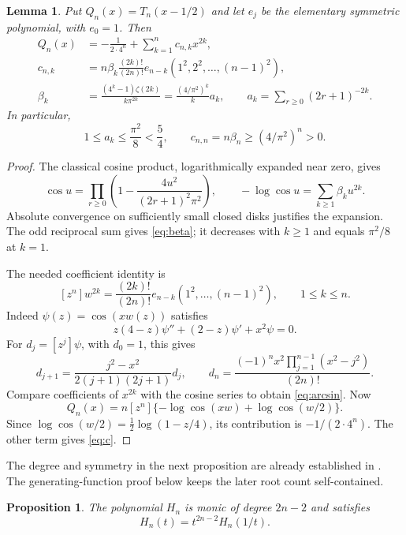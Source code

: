 \documentclass[11pt,letterpaper]{article}
\numberwithin{equation}{section}
\newtheorem{lemma}[theorem]{Lemma}
\newtheorem{proposition}[theorem]{Proposition}
\begin{document}
\begin{lemma}\label{lem:shifted}
Put $Q_n(x)=T_n(x-1/2)$ and let $e_j$ be the elementary symmetric polynomial, with $e_0=1$. Then
\begin{align}
 Q_n(x)&=-\frac1{2\cdot4^n}+\sum_{k=1}^n c_{n,k}x^{2k},\label{eq:Q}\\
 c_{n,k}&=n\beta_k\frac{(2k)!}{(2n)!}
 e_{n-k}(1^2,2^2,\ldots,(n-1)^2),\label{eq:c}\\
 \beta_k&=\frac{(4^k-1)\zeta(2k)}{k\pi^{2k}}
 =\frac{(4/\pi^2)^k}{k}a_k,
 \qquad a_k=\sum_{r\ge0}(2r+1)^{-2k}.\label{eq:beta}
\end{align}
In particular,
\begin{equation}\label{eq:abounds}
 1\le a_k\le\frac{\pi^2}{8}<\frac54,
 \qquad c_{n,n}=n\beta_n\ge(4/\pi^2)^n>0.
\end{equation}
\end{lemma}
\begin{proof}
The classical cosine product, logarithmically expanded near zero, gives
\[
 \cos u=\prod_{r\ge0}\left(1-\frac{4u^2}{(2r+1)^2\pi^2}\right),
 \qquad -\log\cos u=\sum_{k\ge1}\beta_k u^{2k}.
\]
Absolute convergence on sufficiently small closed disks justifies the expansion. The odd reciprocal sum gives \eqref{eq:beta}; it decreases with $k\ge1$ and equals $\pi^2/8$ at $k=1$.

The needed coefficient identity is
\begin{equation}\label{eq:arcsin}
 [z^n]w^{2k}=\frac{(2k)!}{(2n)!}
 e_{n-k}(1^2,\ldots,(n-1)^2),\qquad 1\le k\le n.
\end{equation}
Indeed $\psi(z)=\cos(xw(z))$ satisfies
\[
 z(4-z)\psi''+(2-z)\psi'+x^2\psi=0.
\]
For $d_j=[z^j]\psi$, with $d_0=1$, this gives
\[
 d_{j+1}=\frac{j^2-x^2}{2(j+1)(2j+1)}d_j,
 \qquad d_n=\frac{(-1)^nx^2\prod_{j=1}^{n-1}(x^2-j^2)}{(2n)!}.
\]
Compare coefficients of $x^{2k}$ with the cosine series to obtain \eqref{eq:arcsin}. Now
\[
 Q_n(x)=n[z^n]\{-\log\cos(xw)+\log\cos(w/2)\}.
\]
Since $\log\cos(w/2)=\tfrac12\log(1-z/4)$, its contribution is $-1/(2\cdot4^n)$. The other term gives \eqref{eq:c}.
\end{proof}
The degree and symmetry in the next proposition are already established in \cite[Corollaries~5.13 and~5.16]{LSML}. The generating-function proof below keeps the later root count self-contained.
\begin{proposition}\label{prop:palindrome}
The polynomial $H_n$ is monic of degree $2n-2$ and satisfies
\begin{equation}\label{eq:reciprocal}H_n(t)=t^{2n-2}H_n(1/t).\end{equation}
\end{proposition}
\end{document}
